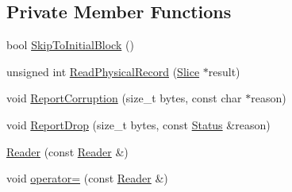 \subsection*{Private Member Functions}
\begin{DoxyCompactItemize}
\item 
bool \hyperlink{classleveldb_1_1log_1_1_reader_ae11273725f413d19be1087f221a48ac7}{Skip\-To\-Initial\-Block} ()
\item 
unsigned int \hyperlink{classleveldb_1_1log_1_1_reader_a001a5d7b4f3cc86c29fc2b0d31a52c27}{Read\-Physical\-Record} (\hyperlink{classleveldb_1_1_slice}{Slice} $\ast$result)
\item 
void \hyperlink{classleveldb_1_1log_1_1_reader_a9ac87fa07d90bf350d2bbbacc3265931}{Report\-Corruption} (size\-\_\-t bytes, const char $\ast$reason)
\item 
void \hyperlink{classleveldb_1_1log_1_1_reader_afadf9a8b44005fd8e9fc798d35befb50}{Report\-Drop} (size\-\_\-t bytes, const \hyperlink{classleveldb_1_1_status}{Status} \&reason)
\item 
\hyperlink{classleveldb_1_1log_1_1_reader_a46b247c0cd5cb07a7304b991910f9f98}{Reader} (const \hyperlink{classleveldb_1_1log_1_1_reader}{Reader} \&)
\item 
void \hyperlink{classleveldb_1_1log_1_1_reader_a4afbb16aaea6a11a8be624b5d425b8a7}{operator=} (const \hyperlink{classleveldb_1_1log_1_1_reader}{Reader} \&)
\end{DoxyCompactItemize}
